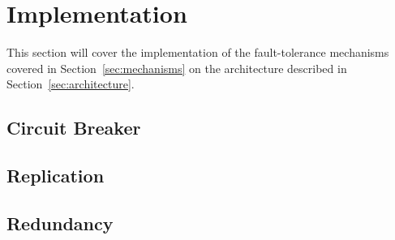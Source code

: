 \section{Implementation}\label{sec:implementation}
This section will cover the implementation of the fault-tolerance mechanisms
covered in Section~\ref{sec:mechanisms} on the architecture described in
Section~\ref{sec:architecture}.

\subsection{Circuit Breaker}

\subsection{Replication}

\subsection{Redundancy}
